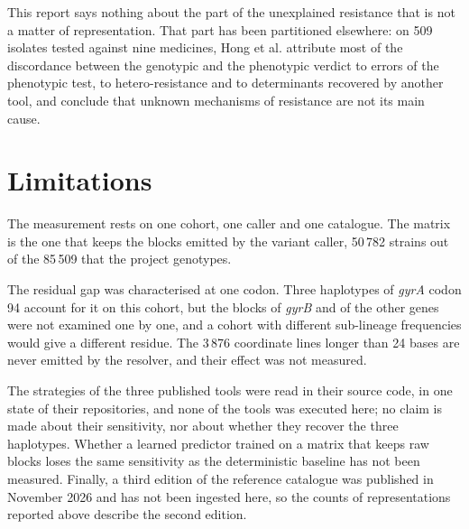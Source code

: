 \documentclass[11pt]{article}
\begin{document}
This report says nothing about the part of the unexplained resistance that is not a matter of
representation. That part has been partitioned elsewhere: on 509 isolates tested against nine
medicines, Hong et al. \cite{hong2026} attribute most of the discordance between the
genotypic and the phenotypic verdict to errors of the phenotypic test, to hetero-resistance
and to determinants recovered by another tool, and conclude that unknown mechanisms of
resistance are not its main cause.

\section{Limitations}

The measurement rests on one cohort, one caller and one catalogue. The matrix is the one that keeps the blocks emitted by the
variant caller, 50\,782 strains out of the 85\,509 that the project genotypes.

The residual gap was characterised at one codon. Three haplotypes of \textit{gyrA} codon 94
account for it on this cohort, but the blocks of \textit{gyrB} and of the other genes were
not examined one by one, and a cohort with different sub-lineage frequencies would give a
different residue. The 3\,876 coordinate lines longer than 24 bases are never emitted by the
resolver, and their effect was not measured.

The strategies of the three published tools were read in their source code, in one state of
their repositories, and none of the tools was executed here; no claim is made about their
sensitivity, nor about whether they recover the three haplotypes. Whether a learned
predictor trained on a matrix that keeps raw blocks loses the same sensitivity as the
deterministic baseline has not been measured. Finally, a third edition of the reference
catalogue was published in November 2026 and has not been ingested here, so the counts of
representations reported above describe the second edition.
\end{document}
